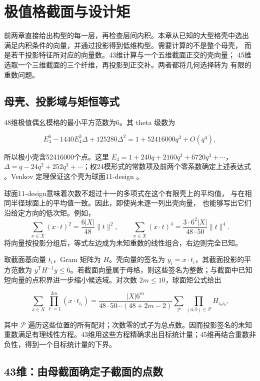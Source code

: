 \section{极值格截面与设计矩}
\label{sec:sections}

前两章直接给出构型的每一层，再检查层间内积。本章从已知的大型格壳中选出
满足内积条件的向量，并通过投影得到低维构型。需要计算的不是整个母壳，
而是若干投影特征所对应的向量数。43维计算与一个五维截面正交的壳向量；
45维选取一个三维截面的三个纤维，再投影到正交补。两者都将几何选择转为
有限的重数问题。

\subsection{母壳、投影域与矩恒等式}

48维极值偶幺模格的最小平方范数为6。其 theta 级数为

\[
E_4^6-1440E_4^3\Delta+125280\Delta^2
=1+52416000q^3+O(q^4),
\]

所以极小壳含52416000个点。这里
\(E_4=1+240q+2160q^2+6720q^3+\cdots\)，\(\Delta=q-24q^2+252q^3+\cdots\)；权24模形式的常数项及前两个零系数确定上述表达式
\cite{conway1999sphere}。Venkov 定理保证这个壳为球面11-design
\cite[定理4.1]{nebe-designs}。

球面11-design意味着次数不超过十一的多项式在这个有限壳上的平均值，
与在相同半径球面上的平均值一致。因此，即使尚未逐一列出壳向量，
也能够写出它们沿给定方向的低次矩。例如，
\[
\sum_{x\in X}(x\cdot t)^2=\frac{6|X|}{48}\|t\|^2,\qquad
\sum_{x\in X}(x\cdot t)^4=\frac{3\cdot6^2|X|}{48\cdot50}\|t\|^4.
\]
将向量按投影分组后，等式左边成为未知重数的线性组合，右边则完全已知。

取截面基向量 \(t_i\)，Gram 矩阵为 \(H\)。壳向量的签名为
\(y_i=x\cdot t_i\)，其截面投影的平方范数为
\(y^{\mathsf T}H^{-1}y\le6\)。若截面向量属于母格，则这些签名为整数；与截面中已知短向量的点积界进一步缩小候选域。对次数
\(2m\le10\)，球面矩公式给出

\[
\sum_{x\in X}\prod_{\ell=1}^{2m}(x\cdot t_{i_\ell})
=\frac{|X|6^m}{48\cdot50\cdots(48+2m-2)}
\sum_{\mathcal P}\prod_{(a,b)\in\mathcal P}H_{i_ai_b},
\]

其中 \(\mathcal P\)
遍历这些位置的所有配对；次数零的式子为总点数。因而投影签名的未知重数满足有理线性方程。43维用这些方程精确求出目标统计量；45维再结合重数非负性，得到一个目标统计量的下界。

\subsection{43维：由母截面确定子截面的点数}

